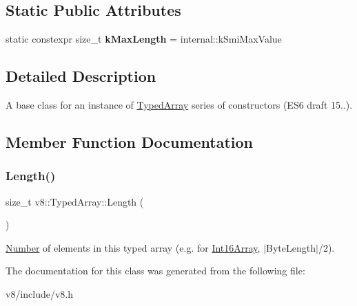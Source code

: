 \subsection*{Static Public Attributes}
\begin{DoxyCompactItemize}
\item 
\mbox{\label{classv8_1_1TypedArray_a54a48f4373da0850663c4393d843b9b0}} 
static constexpr size\+\_\+t {\bfseries k\+Max\+Length} = internal\+::k\+Smi\+Max\+Value
\end{DoxyCompactItemize}


\subsection{Detailed Description}
A base class for an instance of \mbox{\hyperlink{classv8_1_1TypedArray}{Typed\+Array}} series of constructors (E\+S6 draft 15..). 

\subsection{Member Function Documentation}
\mbox{\label{classv8_1_1TypedArray_abb1047225d53d960c0da9c9f83cd7042}} 
\subsubsection{\texorpdfstring{Length()}{Length()}}
{\footnotesize\ttfamily size\+\_\+t v8\+::\+Typed\+Array\+::\+Length (\begin{DoxyParamCaption}{ }\end{DoxyParamCaption})}

\mbox{\hyperlink{classv8_1_1Number}{Number}} of elements in this typed array (e.\+g. for \mbox{\hyperlink{classv8_1_1Int16Array}{Int16\+Array}}, $\vert$\+Byte\+Length$\vert$/2). 

The documentation for this class was generated from the following file\+:\begin{DoxyCompactItemize}
\item 
v8/include/v8.\+h\end{DoxyCompactItemize}
